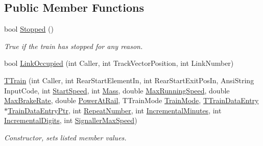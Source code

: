 \subsection*{Public Member Functions}
\begin{DoxyCompactItemize}
\item 
\mbox{\label{class_t_train_a2a2d78164c9dc1881b2c77526f04903f}} 
bool \mbox{\hyperlink{class_t_train_a2a2d78164c9dc1881b2c77526f04903f}{Stopped}} ()
\begin{DoxyCompactList}\small\item\em True if the train has stopped for any reason. \end{DoxyCompactList}\item 
bool \mbox{\hyperlink{class_t_train_aef32cd9a007874ab09ceeac907e7c88b}{Link\+Occupied}} (int Caller, int Track\+Vector\+Position, int Link\+Number)
\item 
\mbox{\label{class_t_train_ae9d788d7bf536de1efe7a67ab5bb8dd7}} 
\mbox{\hyperlink{class_t_train_ae9d788d7bf536de1efe7a67ab5bb8dd7}{T\+Train}} (int Caller, int Rear\+Start\+Element\+In, int Rear\+Start\+Exit\+Pos\+In, Ansi\+String Input\+Code, int \mbox{\hyperlink{class_t_train_adae3a1fd82da0457a983a3ac41cdda3d}{Start\+Speed}}, int \mbox{\hyperlink{class_t_train_ab9dabc7092d31bc27b573e75ac74d0da}{Mass}}, double \mbox{\hyperlink{class_t_train_a0b9ba6ba25c153ba3142f63ec024ccde}{Max\+Running\+Speed}}, double \mbox{\hyperlink{class_t_train_a1cd5cd53f56a05bc4fde337e44bdd6d4}{Max\+Brake\+Rate}}, double \mbox{\hyperlink{class_t_train_a6940d3fe404390d1d345a80bde3f6bf9}{Power\+At\+Rail}}, T\+Train\+Mode \mbox{\hyperlink{class_t_train_a860f87857baefc44a4928311698055a8}{Train\+Mode}}, \mbox{\hyperlink{class_t_train_data_entry}{T\+Train\+Data\+Entry}} $\ast$\mbox{\hyperlink{class_t_train_a28a2217abf201b23fd8b3b92c12038b7}{Train\+Data\+Entry\+Ptr}}, int \mbox{\hyperlink{class_t_train_a459ae11b674cfdccb8872ef25c921fd9}{Repeat\+Number}}, int \mbox{\hyperlink{class_t_train_a8601120683e9bf4f26b0d1cba75ceed4}{Incremental\+Minutes}}, int \mbox{\hyperlink{class_t_train_a7390e5172ab0a5aa998df94953e43fba}{Incremental\+Digits}}, int \mbox{\hyperlink{class_t_train_ad11759e49fa6fcf8367090ef1db490b7}{Signaller\+Max\+Speed}})
\begin{DoxyCompactList}\small\item\em Constructor, sets listed member values. \end{DoxyCompactList}\end{DoxyCompactItemize}
